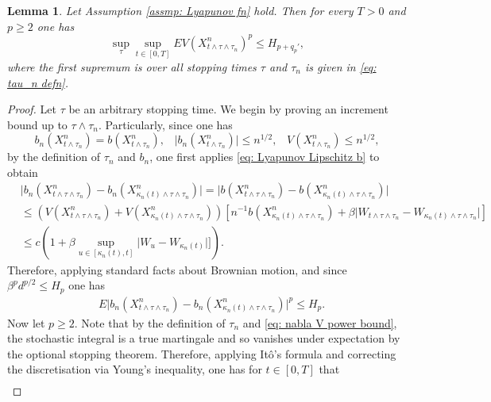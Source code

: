 \documentclass{article}
\newtheorem{lemma}{Lemma}
\begin{document}
\begin{lemma}\label{lem: V bounds scheme stopped}
    Let Assumption \ref{assmp: Lyapunov fn} hold.  Then for every $T>0$ and $p\geq 2$ one has
    \begin{equation}
       \sup_\tau \sup_{t\in [0,T]}EV(X^n_{t\wedge \tau\wedge \tau_n} )^p\leq H_{p+q_p'},
    \end{equation}
    where the first supremum is over all stopping times $\tau$ and $\tau_n$ is given in \eqref{eq: tau_n defn}.
\end{lemma}
\begin{proof}
    Let $\tau$ be an arbitrary stopping time. We begin by proving an increment bound up to $\tau\wedge \tau_n$. Particularly, since one has 
    \begin{equation}
    b_n(X^n_{t\wedge \tau_n})=b(X^n_{t\wedge \tau_n}),\;\;\; \lvert b_n(X^n_{t\wedge \tau_n}) \rvert\leq n^{1/2},\;\;\;V(X^n_{t\wedge \tau_n})\leq n^{1/2},
    \end{equation}
    by the definition of $\tau_n$ and $b_n$, one first applies \eqref{eq: Lyapunov Lipschitz b} to obtain
    \begin{align}
       & \lvert b_n(X^n_{t\wedge \tau\wedge \tau_n})-b_n(X^n_{\kappa_n(t)\wedge\tau\wedge \tau_n})\rvert = \lvert b(X^n_{t\wedge \tau\wedge \tau_n})-b(X^n_{\kappa_n(t)\wedge\tau\wedge \tau_n})\rvert \nonumber \\
       & \leq (V(X^n_{t\wedge \tau\wedge \tau_n})+V(X^n_{\kappa_n(t)\wedge\tau\wedge \tau_n}))[n^{-1}b(X^n_{\kappa_n(t)\wedge\tau\wedge \tau_n})+\beta \lvert W_{t\wedge \tau\wedge \tau_n}-W_{\kappa_n(t)\wedge\tau\wedge \tau_n}\rvert]\nonumber\\
        &\leq c(1+\beta \sup_{u\in [\kappa_n(t),t]}\lvert W_u-W_{\kappa_n(t)}\rvert]).
    \end{align}
    Therefore, applying standard facts about Brownian motion, and since $\beta^pd^{p/2}\leq H_p$ one has
      \begin{align}\label{eq: increment bound}
       & E\lvert b_n(X^n_{t\wedge \tau\wedge \tau_n})-b_n(X^n_{\kappa_n(t)\wedge\tau\wedge \tau_n})\rvert^p\leq H_{p}.
    \end{align}
    Now let $p\geq 2$. Note that by the definition of $\tau_n$ and \eqref{eq: nabla V power bound}, the stochastic integral is a true  martingale and so vanishes under expectation by the optional stopping theorem. Therefore, applying Itô's formula and correcting the discretisation via Young's inequality, one has for $t\in [0,T]$ that
    \begin{align}\label{eq: scheme V Ito}

\end{align}
\end{proof}
\end{document}

